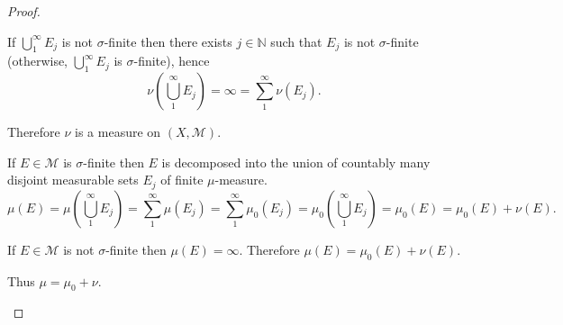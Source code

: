 \begin{proof}
\begin{enumerate}[itemsep=0pt,label=\textbf{\alph*.}]
              If \( \bigcup_{1}^{\infty} E_{j} \) is not \( \sigma \)-finite then there exists \( j \in \mathbb{N} \) such that \( E_{j} \) is not \( \sigma \)-finite (otherwise, \( \bigcup_{1}^{\infty} E_{j} \) is \(\sigma\)-finite), hence
              \[
                  \nu\left(\bigcup_{1}^{\infty} E_{j}\right) = \infty = \sum_{1}^{\infty} \nu(E_{j}).
              \]

              Therefore \( \nu \) is a measure on \( (X, \mathcal{M}) \).

              If \( E \in \mathcal{M} \) is \( \sigma \)-finite then \( E \) is decomposed into the union of countably many disjoint measurable sets \( E_{j} \) of finite  \( \mu \)-measure.
              \[
                  \mu(E) = \mu\left( \bigcup_{1}^{\infty}E_{j} \right) = \sum_{1}^{\infty} \mu(E_{j}) = \sum_{1}^{\infty} \mu_{0}(E_{j}) = \mu_{0}\left(\bigcup_{1}^{\infty} E_{j}\right) = \mu_{0}(E) = \mu_{0}(E) + \nu(E).
              \]

              If \( E \in \mathcal{M} \) is not \( \sigma \)-finite then \( \mu(E) = \infty \). Therefore \( \mu(E) = \mu_{0}(E) + \nu(E) \).

              Thus \( \mu = \mu_{0} + \nu \).
    \end{enumerate}
\end{proof}

\newpage

